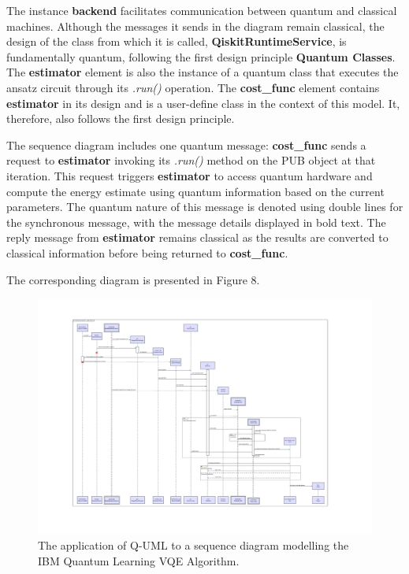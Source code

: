 \documentclass{article}
\begin{document}
The instance \textbf{backend} facilitates communication between quantum and classical machines. Although the messages it sends in the diagram remain classical, the design of the class from which it is called, \textbf{QiskitRuntimeService}, is fundamentally quantum, following the first design principle \textbf{Quantum Classes}. The \textbf{estimator} element is also the instance of a quantum class that executes the ansatz circuit through its \textit{.run()} operation. The \textbf{cost\_func} element contains \textbf{estimator} in its design and is a user-define class in the context of this model. It, therefore, also follows the first design principle. 

The sequence diagram includes one quantum message: \textbf{cost\_func} sends a request to \textbf{estimator} invoking its \textit{.run()} method on the PUB object at that iteration. This request triggers \textbf{estimator} to access quantum hardware and compute the energy estimate using quantum information based on the current parameters. The quantum nature of this message is denoted using double lines for the synchronous message, with the message details displayed in bold text. The reply message from \textbf{estimator} remains classical as the results are converted to classical information before being returned to \textbf{cost\_func}.

The corresponding diagram is presented in Figure 8.

\begin{figure}
    \centering
    \includegraphics[width=1\linewidth]{VQE QUML SD Final Version.pdf}
    \caption{The application of Q-UML to a sequence diagram modelling the IBM Quantum Learning VQE Algorithm.}
    \label{fig:Q-UML_SD}
\end{figure}
\end{document}
